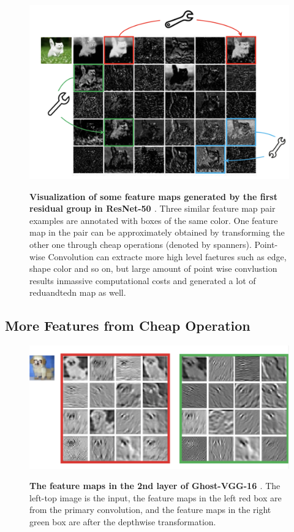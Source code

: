 \begin{figure}[t]
\begin{center}
\centering
\includegraphics[width=\textwidth]{thesis-template-master/images/ghostpointwise.png}
\label{fig:cellnet}
\end{center}
\caption{\textbf{Visualization of some feature maps generated by the first residual group in ResNet-50 \cite{19}}.  Three similar feature map pair examples are annotated with boxes of the same color. One feature map in the pair can be approximately obtained by transforming the other one through cheap operations (denoted by spanners). Point-wise Convolution can extracte more high level faetures such as edge,  shape color and so on, but large amount of point wise convlustion results inmassive computational costs  and generated a lot of reduandtedn map as well.}
\end{figure}


\subsection{ More Features from Cheap Operation}


\begin{figure}[t]
\begin{center}
\centering
\includegraphics[width=\textwidth]{thesis-template-master/images/ghostgener.png}
\label{fig:cellnet}
\end{center}
\caption{\textbf{The feature maps in the 2nd layer of Ghost-VGG-16  \cite{19}}.  The left-top image is the input, the feature maps in the left red box are from the primary convolution, and the feature maps in the right green box are after the depthwise transformation.}
\end{figure}

